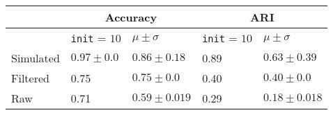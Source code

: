 \begin{tabular}{lllll}
\toprule
{} & \multicolumn{2}{c}{Accuracy} &   \multicolumn{2}{c}{ARI} \\
\midrule
{} & \texttt{init} = $10$ & $\mu \pm \sigma$ &  \texttt{init} = $10$ & $\mu \pm \sigma$ \\
Simulated &  $0.97 \pm 0.0$&  $0.86 \pm 0.18 $ &  0.89 & $0.63 \pm 0.39 $ \\
Filtered  &   0.75  & $0.75 \pm 0.0$ &  0.40 & $0.40 \pm 0.0$ \\
Raw &   0.71 &  $0.59\pm 0.019$ & 0.29 & $0.18\pm 0.018$ \\
\bottomrule
\end{tabular}
